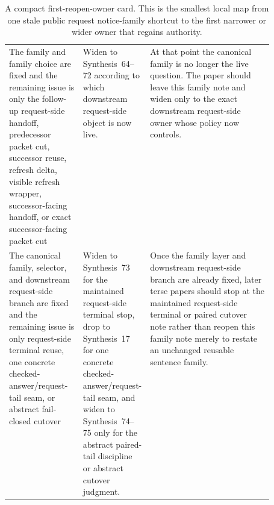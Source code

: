 \documentclass[11pt]{article}
\begin{document}
\begin{table}[t]
\begin{tabularx}{\linewidth}{@{}p{0.29\linewidth}p{0.22\linewidth}X@{}}
The family and family choice are fixed and the remaining issue is only the follow-up request-side handoff, predecessor packet cut, successor reuse, refresh delta, visible refresh wrapper, successor-facing handoff, or exact successor-facing packet cut & Widen to Synthesis~64--72 according to which downstream request-side object is now live. & At that point the canonical family is no longer the live question. The paper should leave this family note and widen only to the exact downstream request-side owner whose policy now controls. \\
The canonical family, selector, and downstream request-side branch are fixed and the remaining issue is only request-side terminal reuse, one concrete checked-answer/request-tail seam, or abstract fail-closed cutover & Widen to Synthesis~73 for the maintained request-side terminal stop, drop to Synthesis~17 for one concrete checked-answer/request-tail seam, and widen to Synthesis~74--75 only for the abstract paired-tail discipline or abstract cutover judgment. & Once the family layer and downstream request-side branch are already fixed, later terse papers should stop at the maintained request-side terminal or paired cutover note rather than reopen this family note merely to restate an unchanged reusable sentence family. \\
\bottomrule
\end{tabularx}
\caption{A compact first-reopen-owner card. This is the smallest local map from one stale public request notice-family shortcut to the first narrower or wider owner that regains authority.}
\label{tab:first-reopen-owner-card-public-request-notice-normal-forms}
\end{table}
\end{document}

